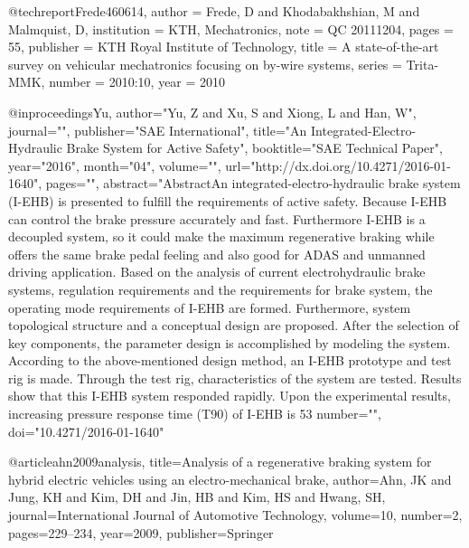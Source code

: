 @techreport{Frede460614,
   author = {Frede, D and Khodabakhshian, M and Malmquist, D},
   institution = {KTH, Mechatronics},
   note = {QC 20111204},
   pages = {55},
   publisher = {KTH Royal Institute of Technology},
   title = {A state-of-the-art survey on vehicular mechatronics focusing on by-wire systems},
   series = {Trita-MMK},
   number = {2010:10},
   year = {2010}
}

@inproceedings{Yu,
author="Yu, Z and Xu, S and Xiong, L and Han, W",
journal="", 
publisher="SAE International",
title="An Integrated-Electro-Hydraulic Brake System for Active Safety", 
booktitle="SAE Technical Paper",
year="2016",
month="04",
volume="",
url="http://dx.doi.org/10.4271/2016-01-1640",
pages="",
abstract="AbstractAn integrated-electro-hydraulic brake system (I-EHB) is presented to fulfill the requirements of active safety. Because I-EHB can control the brake pressure accurately and fast. Furthermore I-EHB is a decoupled system, so it could make the maximum regenerative braking while offers the same brake pedal feeling and also good for ADAS and unmanned driving application. Based on the analysis of current electrohydraulic brake systems, regulation requirements and the requirements for brake system, the operating mode requirements of I-EHB are formed. Furthermore, system topological structure and a conceptual design are proposed. After the selection of key components, the parameter design is accomplished by modeling the system. According to the above-mentioned design method, an I-EHB prototype and test rig is made. Through the test rig, characteristics of the system are tested. Results show that this I-EHB system responded rapidly. Upon the experimental results, increasing pressure response time (T90) of I-EHB is 53%
number="",
doi="10.4271/2016-01-1640"
} 

@article{ahn2009analysis,
  title={Analysis of a regenerative braking system for hybrid electric vehicles using an electro-mechanical brake},
  author={Ahn, JK and Jung, KH and Kim, DH and Jin, HB and Kim, HS and Hwang, SH},
  journal={International Journal of Automotive Technology},
  volume={10},
  number={2},
  pages={229--234},
  year={2009},
  publisher={Springer}
}


